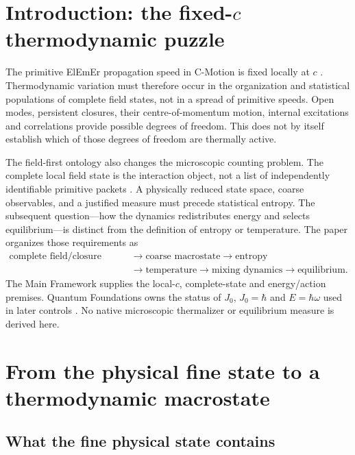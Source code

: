 \documentclass[11pt]{article}
\theoremstyle{definition}
\newcommand{\cmotion}{\mbox{C-Motion}}
\newcommand{\ElEmEr}{\mbox{ElEmEr}}
\begin{document}
\section{Introduction: the fixed-\texorpdfstring{$c$}{c} thermodynamic puzzle}
\label{sec:introduction}
The primitive \ElEmEr{} propagation speed in \cmotion{} is fixed locally at
$c$ \cite{CmotionMainFramework2026}.  Thermodynamic variation must therefore
occur in the organization and statistical populations of complete field states,
not in a spread of primitive speeds.  Open modes, persistent closures, their
centre-of-momentum motion, internal excitations and correlations provide possible
degrees of freedom.  This does not by itself establish which of those degrees of
freedom are thermally active.

The field-first ontology also changes the microscopic counting problem.
The complete local field state is the interaction object, not a list of
independently identifiable primitive packets \cite{CmotionMainFramework2026}.
A physically reduced state space, coarse observables, and a justified measure
must precede statistical entropy.  The subsequent question---how the dynamics
redistributes energy and selects equilibrium---is distinct from the definition
of entropy or temperature.  The paper organizes those requirements as
\begin{equation}
\boxed{
\begin{aligned}
\text{complete field/closure state}
&\longrightarrow \text{coarse macrostate}
\longrightarrow \text{entropy} \\
&\longrightarrow \text{temperature}
\longrightarrow \text{mixing dynamics}
\longrightarrow \text{equilibrium}.
\end{aligned}}
\label{eq:reader-chain}
\end{equation}
The Main Framework supplies the local-$c$, complete-state and energy/action
premises.  Quantum Foundations owns the status of $J_0$, $J_0=\hbar$ and
$E=\hbar\omega$ used in later controls \cite{CmotionQuantumFoundations2026}.
No native microscopic thermalizer or equilibrium measure is derived here.

\section{From the physical fine state to a thermodynamic macrostate}
\label{sec:fine-state}
\subsection{What the fine physical state contains}
\end{document}
